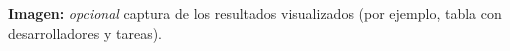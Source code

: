 \noindent\textbf{Imagen:} \textit{opcional} captura de los resultados visualizados (por ejemplo, tabla con desarrolladores y tareas).





